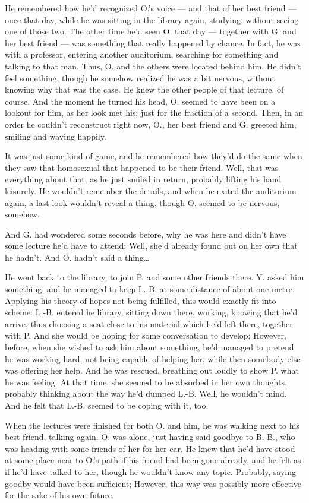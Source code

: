 He remembered how he'd recognized O.'s voice --- and that of her best friend --- once that day, while he was sitting in the library again, studying, without seeing one of those two. 
The other time he'd seen O. that day --- together with G. and her best friend --- was something that really happened by chance. In fact, he was with a professor, entering another auditorium, searching for something and talking to that man. Thus, O. and the others were located behind him. He didn't feel something, though he somehow realized he was a bit nervous, without knowing why that was the case. He knew the other people of that lecture, of course. And the moment he turned his head, O. seemed to have been on a lookout for him, as her look met his; just for the fraction of a second. Then, in an order he couldn't reconstruct right now, O., her best friend and G. greeted him, smiling and waving happily.

It was just some kind of game, and he remembered how they'd do the same when they saw that homosexual that happened to be their friend. 
Well, that was everything about that, as he just smiled in return, probably lifting his hand leisurely. He wouldn't remember the details, and when he exited the auditorium again, a last look wouldn't reveal a thing, though O. seemed to be nervous, somehow.

And G. had wondered some seconds before, why he was here and didn't have some lecture he'd have to attend; Well, she'd already found out on her own that he hadn't. 
And O. hadn't said a thing\ldots

He went back to the library, to join P. and some other friends there. 
Y. asked him something, and he managed to keep L.-B. at some distance of about one metre. Applying his theory of hopes not being fulfilled, this would exactly fit into scheme: L.-B. entered he library, sitting down there, working, knowing that he'd arrive, thus choosing a seat close to his material which he'd left there, together with P. And she would be hoping for some conversation to develop; However, before, when she wished to ask him about something, he'd managed to pretend he was working hard, not being capable of helping her, while then somebody else was offering her help. And he was rescued, breathing out loudly to show P. what he was feeling. At that time, she seemed to be absorbed in her own thoughts, probably thinking about the way he'd dumped L.-B. Well, he wouldn't mind. And he felt that L.-B. seemed to be coping with it, too.

When the lectures were finished for both O. and him, he was walking next to his best friend, talking again. O. was alone, just having said goodbye to B.-B., who was heading with some friends of her for her car. He knew that he'd have stood at some place near to O.'s path if his friend had been gone already, and he felt as if he'd have talked to her, though he wouldn't know any topic. Probably, saying goodby would have been sufficient; However, this way was possibly more effective for the sake of his own future.

